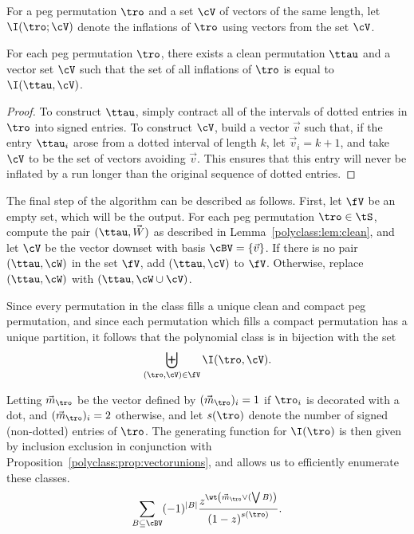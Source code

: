 \documentclass[12pt,twoside]{memoir}
\begin{document}
      \begin{definition}\label{polyclass:def:restricted-inflations}
        For a peg permutation $\tro$ and a set $\cV$ of vectors of the same
        length, let $\I(\tro;\cV)$ denote the inflations of $\tro$ using vectors
        from the set $\cV$. 
      \end{definition}

      \begin{lemma}\label{polyclass:lem:clean}
        For each peg permutation $\tro$, there exists a clean permutation $\ttau$
        and a vector set $\cV$ such that the set of all inflations of $\tro$ is equal
        to $\I(\ttau, \cV)$. 
      \end{lemma}
      \begin{proof}
        To construct $\ttau$, simply contract all of the intervals of dotted
        entries in $\tro$ into signed entries. To construct $\cV$, build a vector
        $\vec v$ such that, if the entry $\ttau_i$ arose from a dotted interval
        of length $k$, let $\vec v_i = k+1$, and take $\cV$ to be the set of
        vectors avoiding $\vec v$.  This ensures that this entry will never be
        inflated by a run longer than the original sequence of dotted entries.
      \end{proof}

      The final step of the algorithm can be described as follows. First, let $\fV$ be
      an empty set, which will be the output. For each peg permutation $\tro \in \tS$, 
      compute the pair $(\ttau, \vec W)$ as described in
      Lemma~\ref{polyclass:lem:clean}, and let $\cV$ be the vector downset with
      basis $\cBV = \{\vec v\}$. 
      If there is no pair $(\ttau, \cW)$ in the
      set $\fV$, add $(\ttau, \cV)$ to $\fV$. 
      Otherwise, replace $(\ttau, \cW)$ with $(\ttau, \cW \cup \cV)$. 

      Since every permutation in the class fills a unique clean and compact
      peg permutation, and since each permutation which fills a compact
      permutation has a unique partition, it follows that the polynomial class is
      in bijection with the set 
      $$ \biguplus_{(\tro,\cV) \in \fV} \I(\tro, \cV).$$

      Letting $\vec m_{\tro}$ be the vector defined by $(\vec m_{\tro})_i
      = 1$ if $\tro_i$ is decorated with a dot, and $(\vec m_{\tro})_i = 2$
      otherwise, and let $s(\tro)$ denote the number of signed (non-dotted)
      entries of $\tro$. The generating function for $\I(\tro)$ is then given by
      inclusion exclusion in conjunction with
      Proposition~\ref{polyclass:prop:vectorunions}, and allows us to efficiently
      enumerate these classes.  
      $$ \sum_{B \subseteq \cBV} (-1)^{|B|} 
          \frac{ z^{\wt \left( \vec m_{\tro} \vee (\bigvee B)\right)}}{%
          {(1-z)}^{ s( \tro ) } }.  $$
\end{document}
